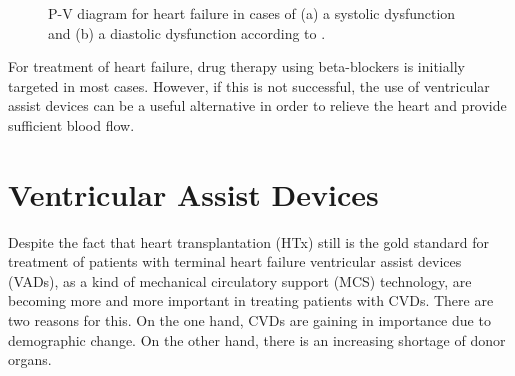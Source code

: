 \begin{figure}[h]
  \centering
  \caption[P-V diagram for heart failure]{P-V diagram for heart failure in cases of (a) a systolic dysfunction and (b) a diastolic dysfunction according to \cite{HKS_pv}.}
  \label{fig:hf_dys}
\end{figure}

For treatment of heart failure, drug therapy using beta-blockers is initially targeted in most cases. However, if this is not successful, the use of ventricular assist devices can be a useful alternative in order to relieve the heart and provide sufficient blood flow. \cite{HKS4}

\section{Ventricular Assist Devices}
Despite the fact that heart transplantation (HTx) still is the gold standard for treatment of patients with terminal heart failure \cite{VAD2} ventricular assist devices (VADs), as a kind of mechanical circulatory support (MCS) technology, are becoming more and more important in treating patients with CVDs. There are two reasons for this. On the one hand, CVDs are gaining in importance due to demographic change. On the other hand, there is an increasing shortage of donor organs. \cite{VAD7}

